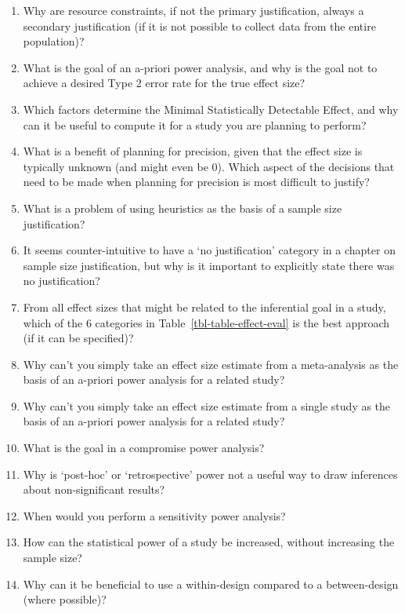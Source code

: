 \documentclass[
  letterpaper,
  DIV=11,
  numbers=noendperiod]{scrreprt}
\begin{document}
\begin{enumerate}
\def\labelenumi{\arabic{enumi}.}
\item
  Why are resource constraints, if not the primary justification, always
  a secondary justification (if it is not possible to collect data from
  the entire population)?
\item
  What is the goal of an a-priori power analysis, and why is the goal
  not to achieve a desired Type 2 error rate for the true effect size?
\item
  Which factors determine the Minimal Statistically Detectable Effect,
  and why can it be useful to compute it for a study you are planning to
  perform?
\item
  What is a benefit of planning for precision, given that the effect
  size is typically unknown (and might even be 0). Which aspect of the
  decisions that need to be made when planning for precision is most
  difficult to justify?
\item
  What is a problem of using heuristics as the basis of a sample size
  justification?
\item
  It seems counter-intuitive to have a `no justification' category in a
  chapter on sample size justification, but why is it important to
  explicitly state there was no justification?
\item
  From all effect sizes that might be related to the inferential goal in
  a study, which of the 6 categories in
  Table~\ref{tbl-table-effect-eval} is the best approach (if it can be
  specified)?
\item
  Why can't you simply take an effect size estimate from a meta-analysis
  as the basis of an a-priori power analysis for a related study?
\item
  Why can't you simply take an effect size estimate from a single study
  as the basis of an a-priori power analysis for a related study?
\item
  What is the goal in a compromise power analysis?
\item
  Why is `post-hoc' or `retrospective' power not a useful way to draw
  inferences about non-significant results?
\item
  When would you perform a sensitivity power analysis?
\item
  How can the statistical power of a study be increased, without
  increasing the sample size?
\item
  Why can it be beneficial to use a within-design compared to a
  between-design (where possible)?
\end{enumerate}
\end{document}
